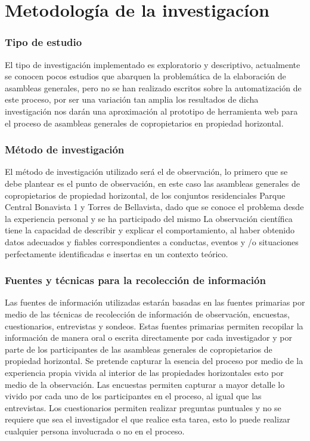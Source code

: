 \section{Metodología de la investigacíon}

\subsubsection{Tipo de estudio}

El tipo de investigación implementado es exploratorio y descriptivo, actualmente se conocen pocos estudios que abarquen la problemática de la elaboración de asambleas generales, pero no se han realizado escritos sobre la automatización de este proceso, por ser una variación tan amplia los resultados de dicha investigación nos darán una aproximación al prototipo de herramienta web para el proceso de asambleas generales de copropietarios en propiedad horizontal.

\subsubsection{Método de investigación}

El método de investigación utilizado será el de observación, lo primero que se debe plantear es el punto de observación, en este caso las asambleas generales de copropietarios de propiedad horizontal, de los conjuntos residenciales Parque Central Bonavista 1 y Torres de Bellavista, dado que se conoce el problema desde la experiencia personal y se ha participado del mismo
La observación científica tiene la capacidad de describir y explicar el comportamiento, al haber obtenido datos adecuados y fiables correspondientes a conductas, eventos y /o situaciones perfectamente identificadas e insertas en un contexto teórico.

\subsubsection{Fuentes y técnicas para la recolección de información}

Las fuentes de información utilizadas estarán basadas en las fuentes primarias por medio de las técnicas de recolección de información de observación, encuestas, cuestionarios, entrevistas y sondeos. Estas fuentes primarias permiten recopilar la información de manera oral o escrita directamente por cada investigador y por parte de los participantes de las asambleas generales de copropietarios de propiedad horizontal.
Se pretende capturar la esencia del proceso por medio de la experiencia propia vivida al interior de las propiedades horizontales esto por medio de la observación. Las encuestas permiten capturar a mayor detalle lo vivido por cada uno de los participantes en el proceso, al igual que las entrevistas. Los cuestionarios permiten realizar preguntas puntuales y no se requiere que sea el investigador el que realice esta tarea, esto lo puede realizar cualquier persona involucrada o no en el proceso.

